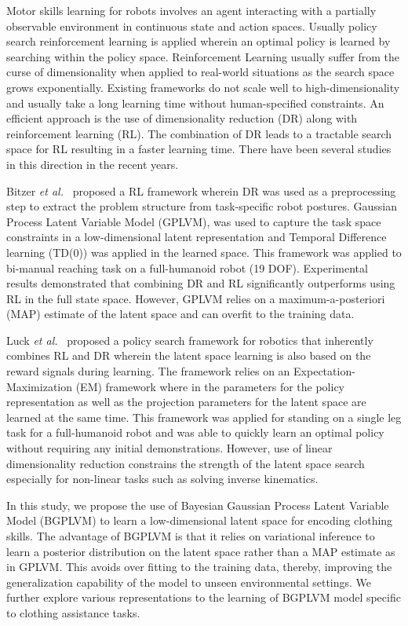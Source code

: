\documentclass[a4paper]{article}
\begin{document}
Motor skills learning for robots involves an agent interacting with a partially observable environment in continuous state and action spaces. Usually policy search reinforcement learning is applied wherein an optimal policy is learned by searching within the policy space. Reinforcement Learning usually suffer from the curse of dimensionality when applied to real-world situations as the search space grows exponentially. Existing frameworks do not scale well to high-dimensionality and usually take a long learning time without human-specified constraints. An efficient approach is the use of dimensionality reduction (DR) along with reinforcement learning (RL). The combination of DR leads to a tractable search space for RL resulting in a faster learning time. There have been several studies in this direction in the recent years.

Bitzer \emph{et al.}~\cite{bitzer} proposed a RL framework wherein DR was used as a preprocessing step to extract the problem structure from task-specific robot postures. Gaussian Process Latent Variable Model (GPLVM), was used to capture the task space constraints in a low-dimensional latent representation and Temporal Difference learning (TD(0)) was applied in the learned space. This framework was applied to bi-manual reaching task on a full-humanoid robot (19 DOF). Experimental results demonstrated that combining DR and RL significantly outperforms using RL in the full state space. However, GPLVM relies on a maximum-a-posteriori (MAP) estimate of the latent space and can overfit to the training data.

Luck \emph{et al.}~\cite{luck} proposed a policy search framework for robotics that inherently combines RL and DR wherein the latent space learning is also based on the reward signals during learning. The framework relies on an Expectation-Maximization (EM) framework where in the parameters for the policy representation as well as the projection parameters for the latent space are learned at the same time. This framework was applied for standing on a single leg task for a full-humanoid robot and was able to quickly learn an optimal policy without requiring any initial demonstrations. However, use of linear dimensionality reduction constrains the strength of the latent space search especially for non-linear tasks such as solving inverse kinematics.

In this study, we propose the use of Bayesian Gaussian Process Latent Variable Model (BGPLVM) to learn a low-dimensional latent space for encoding clothing skills. The advantage of BGPLVM is that it relies on variational inference to learn a posterior distribution on the latent space rather than a MAP estimate as in GPLVM. This avoids over fitting to the training data, thereby, improving the generalization capability of the model to unseen environmental settings. We further explore various representations to the learning of BGPLVM model specific to clothing assistance tasks.
\end{document}
